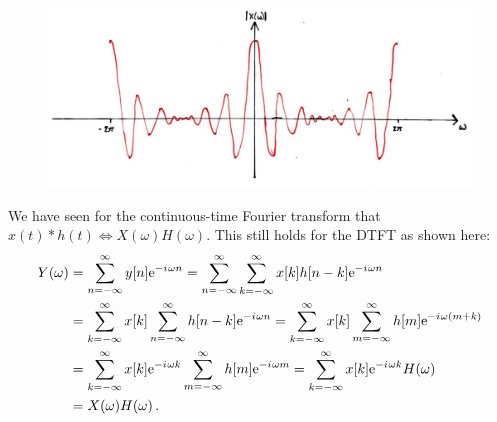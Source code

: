 %
\begin{figure}[!htb]
  \includegraphics[width=\textwidth]{images/lecture_7_periodic_sinc.JPG}
  \caption{
  }
  \label{fig::lecture_7_periodic_sinc}
\end{figure}
%
We have seen for the continuous-time Fourier transform that
$x(t) * h(t) \Longleftrightarrow X(\omega)H(\omega)$. This still holds for the DTFT
as shown here:
%
\begin{align*}
  Y(\omega) &= \sum_{n=-\infty}^\infty y[n]\mathrm{e}^{-{i\mkern1mu}\omega n} = \sum_{n=-\infty}^\infty\sum_{k=-\infty}^\infty x[k]h[n-k]\mathrm{e}^{-{i\mkern1mu}\omega n} \\
  &= \sum_{k=-\infty}^\infty x[k]\sum_{n=-\infty}^\infty h[n-k]\mathrm{e}^{-{i\mkern1mu}\omega n} = \sum_{k=-\infty}^\infty x[k]\sum_{m=-\infty}^\infty h[m]\mathrm{e}^{-{i\mkern1mu}\omega(m + k)} \\
  &= \sum_{k=-\infty}^\infty x[k]\mathrm{e}^{-{i\mkern1mu}\omega k}\sum_{m=-\infty}^\infty h[m]\mathrm{e}^{-{i\mkern1mu}\omega m} 
  = \sum_{k=-\infty}^\infty x[k]\mathrm{e}^{-{i\mkern1mu}\omega k} H(\omega) \\
  &= X(\omega)H(\omega) \,.
\end{align*}

